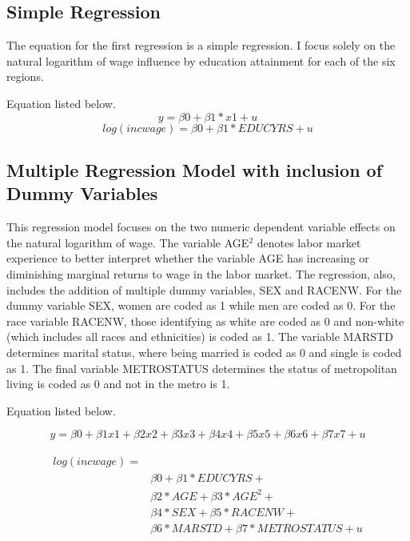 \documentclass[12pt, English]{article}
\begin{document}
\subsection{Simple Regression}
The equation for the first regression is a simple regression. I focus solely on the natural logarithm of wage influence by education attainment for each of the six regions. 

Equation listed below.
\begin{equation}
y = \beta0 + \beta1*x1 + u
\end{equation}
\begin{equation}
    log(incwage) = \beta0 + \beta1*EDUCYRS + u 
\end{equation}
\subsection{Multiple Regression Model with inclusion of Dummy Variables}
This regression model focuses on the two numeric dependent variable effects on the natural logarithm of wage. The variable AGE$^2$ denotes labor market experience to better interpret whether the variable AGE has increasing or diminishing marginal returns to wage in the labor market. The regression, also, includes the addition of multiple dummy variables, SEX and RACENW. For the dummy variable SEX, women are coded as 1 while men are coded as 0. For the race variable RACENW, those identifying as white are coded as 0 and non-white (which includes all races and ethnicities) is coded as 1. The variable MARSTD determines marital status, where being married is coded as 0 and single is coded as 1. The final variable METROSTATUS determines the status of metropolitan living is coded as 0 and not in the metro is 1.  

Equation listed below. 

\begin{equation}
    y = \beta0 + \beta1x1+ \beta2x2+ \beta3x3 + \beta4x4 + \beta5x5 + \beta6x6 + \beta7x7 + u 
\end{equation}

\begin{equation}
\begin{aligned}
\begin{split}
log(incwage) = \\
&   \beta0 + \beta1*EDUCYRS + \\
&  \beta2*AGE+ \beta3*AGE^2 + \\
&  \beta4*SEX + \beta5*RACENW + \\
&  \beta6*MARSTD +\beta7*METROSTATUS + u
\end{split}
\end{aligned}
\end{equation}
\end{document}
